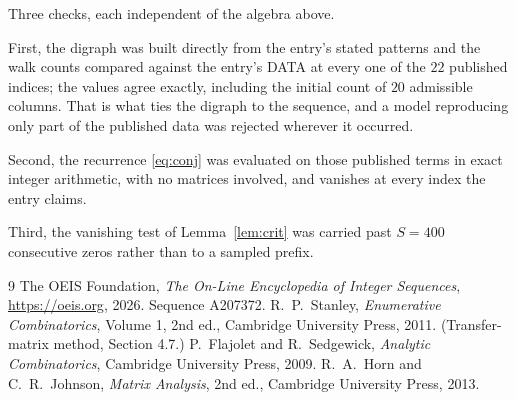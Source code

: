 \documentclass[11pt,a4paper]{article}
\theoremstyle{plain}
\theoremstyle{definition}
\begin{document}
Three checks, each independent of the algebra above.

First, the digraph was built directly from the entry's stated patterns and the walk counts
compared against the entry's DATA at every one of the $22$ published indices; the
values agree exactly, including the initial count of $20$ admissible columns. That is
what ties the digraph to the sequence, and a model reproducing only part of the published
data was rejected wherever it occurred.

Second, the recurrence \eqref{eq:conj} was evaluated on those published terms in exact
integer arithmetic, with no matrices involved, and vanishes at every index the entry claims.

Third, the vanishing test of Lemma~\ref{lem:crit} was carried past $S=400$ consecutive
zeros rather than to a sampled prefix.

\begin{thebibliography}{9}
 The OEIS Foundation, \emph{The On-Line Encyclopedia of Integer
Sequences}, \url{https://oeis.org}, 2026. Sequence A207372.
 R.~P.~Stanley, \emph{Enumerative Combinatorics}, Volume 1, 2nd ed.,
Cambridge University Press, 2011. (Transfer-matrix method, Section 4.7.)
 P.~Flajolet and R.~Sedgewick, \emph{Analytic Combinatorics}, Cambridge
University Press, 2009.
 R.~A.~Horn and C.~R.~Johnson, \emph{Matrix Analysis}, 2nd ed., Cambridge
University Press, 2013.
\end{thebibliography}
\end{document}
